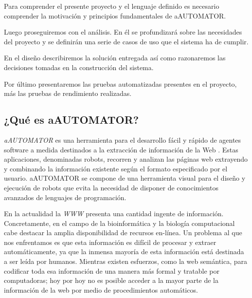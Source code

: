 Para comprender el presente proyecto y el lenguaje definido es
necesario comprender la motivación y principios fundamentales de
aAUTOMATOR.

Luego proseguiremos con el análisis. En él se profundizará sobre las
necesidades del proyecto y se definirán una serie de casos de uso que
el sistema ha de cumplir.

En el diseño describiremos la solución entregada así como razonaremos
las decisiones tomadas en la construcción del sistema.

Por último presentaremos las pruebas automatizadas presentes en el
proyecto, más las pruebas de rendimiento realizadas.

\subsection{¿Qué es aAUTOMATOR?}
\emph{aAUTOMATOR} es una herramienta para el desarrollo fácil y rápido
de agentes software a medida destinados a la extracción de información
de la Web \cite{aAUTOMATOR}. Estas aplicaciones, denominadas robots,
recorren y analizan las páginas web extrayendo y combinando la
información existente según el formato especificado por el
usuario. aAUTOMATOR se compone de una herramienta visual para el
diseño y ejecución de robots que evita la necesidad de disponer de
conocimientos avanzados de lenguajes de programación.

En la actualidad la \emph{WWW} presenta una cantidad ingente de
información. Concretamente, en el campo de la bioinformática y la
biología computacional cabe destacar la amplia disponibilidad de
recursos en-línea.  Un problema al que nos enfrentamos es que esta
información es difícil de procesar y extraer automáticamente, ya que
la inmensa mayoría de esta información está destinada a ser leída por
humanos. Mientras existen esfuerzos, como la web semántica, para
codificar toda esa información de una manera más formal y tratable por
computadoras; hoy por hoy no es posible acceder a la mayor parte de la
información de la web por medio de procedimientos automáticos.

